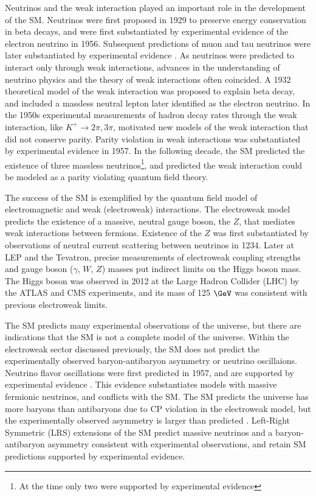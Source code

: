 Neutrinos and the weak interaction played an important role in the development of the SM.  
Neutrinos were first proposed in 1929 to preserve energy conservation in beta decays, and were first 
substantiated by experimental evidence \cite{firstNuDiscovery} of the electron neutrino in 1956.  
Subsequent predictions of muon and tau neutrinos were later substantiated 
by experimental evidence \cite{muNuDiscovery,tauNuDiscovery}.  As neutrinos were predicted to interact only through weak 
interactions, advances in the understanding of neutrino physics and the theory of weak interactions often coincided.  
A 1932 theoretical model of the weak interaction was proposed to explain beta decay, and included a massless 
neutral lepton later identified as the electron neutrino.  In the 1950s experimental measurements of 
hadron decay rates through the weak interaction, like $K^{+} \rightarrow 2\pi, 3\pi$, motivated new 
models of the weak interaction that did not conserve parity.  Parity violation in weak interactions was 
substantiated by experimental evidence \cite{weakParityViolation} in 1957.  In the following decade, the 
SM predicted the existence of three massless neutrinos\footnote{At the time only two were supported 
by experimental evidence}, and predicted the weak interaction could be modeled as a parity violating 
quantum field theory.

The success of the SM is exemplified by the quantum field model of electromagnetic and weak (electroweak) 
interactions.  The electroweak model predicts the existence of a massive, neutral gauge boson, the $Z$, 
that mediates weak interactions between fermions.  Existence of the $Z$ was first substantiated by 
observations of neutral current scattering between neutrinos \cite{nuScattering} in 1234.  Later at 
LEP and the Tevatron, precise measurements of electroweak coupling strengths and gauge boson ($\gamma$, $W$, $Z$) 
masses put indirect limits on the Higgs boson mass.  The Higgs boson was observed in 2012 at the Large Hadron Collider 
(LHC) by the ATLAS and CMS experiments, and its mass\cite{combinedHiggsResult} of 125 $\GeV$ was consistent 
with previous electroweak limits.

The SM predicts many experimental observations of the universe, but there are indications that the SM is 
not a complete model of the universe.  Within the electroweak sector discussed previously, the SM does 
not predict the experimentally observed baryon-antibaryon asymmetry or neutrino oscillaions.  Neutrino flavor 
oscillations were first predicted in 1957, and are supported by experimental evidence 
\cite{kamiokandeTwo,solarNuSummary,NOvAresults,mainzPhaseIIResults,t2kResults}.  This evidence substantiates 
models with massive fermionic neutrinos, and conflicts with the SM.  The SM predicts the universe has more 
baryons than antibaryons due to CP violation in the electroweak model, but the experimentally observed 
asymmetry is larger than predicted \cite{surveyOfExtensions}.  Left-Right Symmetric (LRS) extensions of 
the SM predict massive neutrinos and a baryon-antibaryon asymmetry consistent with experimental observations, 
and retain SM predictions supported by experimental evidence.

